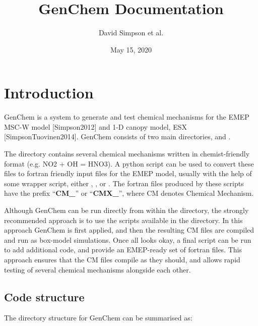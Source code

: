 \documentclass[a4paper,10pt,english]{sphinxmanual}
\title{GenChem Documentation}
\date{May 15, 2020}
\author{David Simpson et al.}
\begin{document}
\pagestyle{empty}
\sphinxmaketitle
\pagestyle{plain}
\sphinxtableofcontents
\pagestyle{normal}
\label{\detokenize{index::doc}}


\ignorespaces 

\chapter{Introduction}
\label{\detokenize{GenChemDoc_intro:introduction}}\label{\detokenize{GenChemDoc_intro:index-0}}\label{\detokenize{GenChemDoc_intro::doc}}
GenChem is a system to generate and test chemical mechanisms for the
EMEP MSC-W model {[}Simpson2012{]} and 1-D canopy model, ESX {[}SimpsonTuovinen2014{]}.
GenChem consists of two main directories,  and .

The  directory contains several chemical mechanisms written
in chemist-friendly format (e.g.   NO2 + OH = HNO3).
A python script  can be used to convert these files
to fortran friendly input files for the EMEP model, usually with the help
of some wrapper script, either , , or .
The fortran files produced by these scripts
have the prefix “{\color{red}\bfseries{}CM\_}” or “{\color{red}\bfseries{}CMX\_}”, where CM denotes Chemical Mechanism.

Although GenChem can be run directly from within the  directory,
the strongly recommended  approach is to use the scripts available
in the  directory. In this approach GenChem is first applied, and
then the resulting CM files are compiled and run
as box-model simulations. Once all looks okay, a final script
can be run to add additional code, and provide an EMEP-ready
set of fortran files. This approach ensures that the CM files
compile as they should, and allows rapid testing of several chemical
mechanisms alongside each other.


\section{Code structure}
\label{\detokenize{GenChemDoc_intro:code-structure}}
The directory structure for GenChem can be summarised as:
\end{document}
